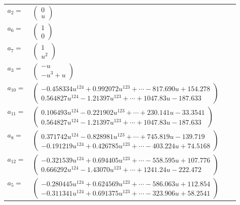 \documentclass[1p]{elsarticle_modified}
\theoremstyle{definition}
\begin{document}
\begin{tabular}{m{7pt} m{180pt} m{7pt} m{180pt} }
\flushright $a_{2}=$&$\begin{pmatrix}0\\u\end{pmatrix}$ \\
\flushright $a_{6}=$&$\begin{pmatrix}1\\0\end{pmatrix}$ \\
\flushright $a_{7}=$&$\begin{pmatrix}1\\u^2\end{pmatrix}$ \\
\flushright $a_{3}=$&$\begin{pmatrix}- u\\- u^3+u\end{pmatrix}$ \\
\flushright $a_{10}=$&$\begin{pmatrix}-0.458334 u^{124}+0.992072 u^{123}+\cdots-817.690 u+154.278\\0.564827 u^{124}-1.21397 u^{123}+\cdots+1047.83 u-187.633\end{pmatrix}$ \\
\flushright $a_{11}=$&$\begin{pmatrix}0.106493 u^{124}-0.221902 u^{123}+\cdots+230.141 u-33.3541\\0.564827 u^{124}-1.21397 u^{123}+\cdots+1047.83 u-187.633\end{pmatrix}$ \\
\flushright $a_{8}=$&$\begin{pmatrix}0.371742 u^{124}-0.828981 u^{123}+\cdots+745.819 u-139.719\\-0.191219 u^{124}+0.426785 u^{123}+\cdots-403.224 u+74.5168\end{pmatrix}$ \\
\flushright $a_{12}=$&$\begin{pmatrix}-0.321539 u^{124}+0.694405 u^{123}+\cdots-558.595 u+107.776\\0.666292 u^{124}-1.43070 u^{123}+\cdots+1241.24 u-222.472\end{pmatrix}$ \\
\flushright $a_{5}=$&$\begin{pmatrix}-0.280445 u^{124}+0.624569 u^{123}+\cdots-586.063 u+112.854\\-0.311341 u^{124}+0.691375 u^{123}+\cdots-323.906 u+58.2541\end{pmatrix}$ \\

\end{tabular}
\end{document}
